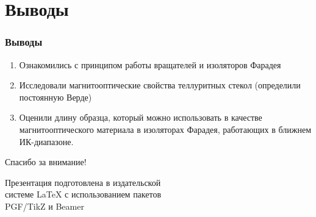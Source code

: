 \documentclass[10pt,pdf,hyperref={unicode}, dvipsnames]{beamer}
\begin{document}
\section{Выводы}
\begin{frame}
	\frametitle{Выводы}
	\begin{enumerate} 
		\item 
			  Ознакомились с принципом работы вращателей и изоляторов Фарадея
		\item 
		      Исследовали магнитооптические свойства теллуритных стекол (определили постоянную Верде)
		\item 
		      Оценили длину образца, который можно использовать в качестве магнитооптического материала в изоляторах Фарадея, работающих в ближнем ИК-диапазоне.
	\end{enumerate}
\end{frame}


\begin{frame}[plain]
	\vspace{4cm}
	\begin{center}
		\Huge
		Спасибо за внимание!
	\end{center}
	\vspace{2.5cm}
	\begin{center}
		\color{black!30!white}
		Презентация подготовлена в издательской \\
		системе LaTeX с использованием пакетов \\
		PGF/TikZ и Beamer
	\end{center}
\end{frame}

\end{document}
